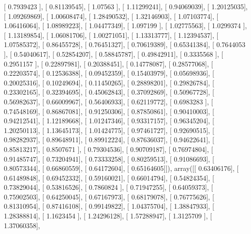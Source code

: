 \documentclass{article}
\begin{document}
       [ 0.7939423 ],
       [ 0.81139545],
       [ 1.07563   ],
       [ 1.11299241],
       [ 0.94069039],
       [ 1.20125035],
       [ 1.09269869],
       [ 1.00608474],
       [ 1.28490532],
       [ 1.32146903],
       [ 1.07103774],
       [ 1.06416064],
       [ 1.08989223],
       [ 1.04477349],
       [ 1.097199  ],
       [ 1.02775563],
       [ 1.0299374 ],
       [ 1.13189854],
       [ 1.06081706],
       [ 1.00271051],
       [ 1.13313777],
       [ 1.12394537],
       [ 1.07585372],
       [ 0.86455728],
       [ 0.76451327],
       [ 0.70619389],
       [ 0.65341384],
       [ 0.7644053 ],
       [ 0.54040617],
       [ 0.52854207],
       [ 0.58845787],
       [ 0.49842911],
       [ 0.3335568 ],
       [ 0.2951157 ],
       [ 0.22897981],
       [ 0.20388451],
       [ 0.14778087],
       [ 0.28577068],
       [ 0.22203574],
       [ 0.12536388],
       [ 0.09452359],
       [ 0.15403979],
       [ 0.05698936],
       [ 0.20025316],
       [ 0.10249694],
       [ 0.11450265],
       [ 0.28898201],
       [ 0.29826784],
       [ 0.23302165],
       [ 0.32394695],
       [ 0.45062843],
       [ 0.37092869],
       [ 0.50967728],
       [ 0.56982637],
       [ 0.66009967],
       [ 0.56406933],
       [ 0.62119772],
       [ 0.6983283 ],
       [ 0.74548169],
       [ 0.86867081],
       [ 0.91250306],
       [ 0.87850861],
       [ 0.90410003],
       [ 0.94212541],
       [ 1.12189668],
       [ 1.01247346],
       [ 0.93317157],
       [ 0.96345204],
       [ 1.20250113],
       [ 1.13645173],
       [ 1.01424775],
       [ 0.97461727],
       [ 0.92690515],
       [ 0.98282937],
       [ 0.89648911],
       [ 0.89912224],
       [ 0.87636037],
       [ 0.94622641],
       [ 0.85813217],
       [ 0.8507671 ],
       [ 0.79304536],
       [ 0.90709187],
       [ 0.76974804],
       [ 0.91485747],
       [ 0.73204941],
       [ 0.73333258],
       [ 0.80259513],
       [ 0.91086693],
       [ 0.80573344],
       [ 0.66860559],
       [ 0.64172604],
       [ 0.65164605]]), array([[ 0.63406176],
       [ 0.61489848],
       [ 0.69452332],
       [ 0.59160021],
       [ 0.66014794],
       [ 0.54824354],
       [ 0.73829044],
       [ 0.53816526],
       [ 0.7860824 ],
       [ 0.71947255],
       [ 0.64059373],
       [ 0.75902503],
       [ 0.64250045],
       [ 0.67167973],
       [ 0.68179078],
       [ 0.76775626],
       [ 0.81310954],
       [ 0.87416108],
       [ 0.99149822],
       [ 1.04375704],
       [ 1.38847933],
       [ 1.28388814],
       [ 1.1623454 ],
       [ 1.24296128],
       [ 1.57288947],
       [ 1.3125709 ],
       [ 1.37060358],
\end{document}
